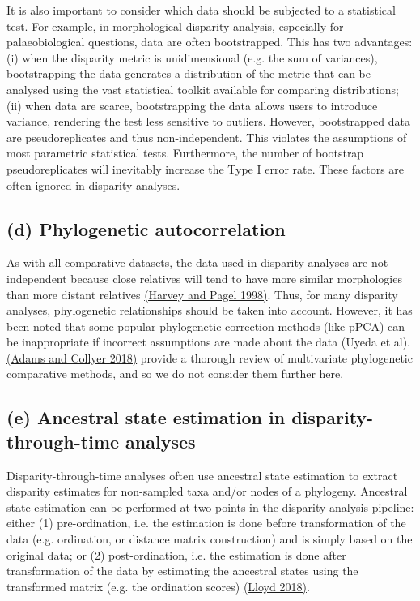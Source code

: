 It is also important to consider which data should be subjected to a
statistical test. For example, in morphological disparity analysis,
especially for palaeobiological questions, data are often bootstrapped.
This has two advantages: (i) when the disparity metric is unidimensional
(e.g. the sum of variances), bootstrapping the data generates a
distribution of the metric that can be analysed using the vast
statistical toolkit available for comparing distributions; (ii) when
data are scarce, bootstrapping the data allows users to introduce
variance, rendering the test less sensitive to outliers. However,
bootstrapped data are pseudoreplicates and thus non-independent. This
violates the assumptions of most parametric statistical tests.
Furthermore, the number of bootstrap pseudoreplicates will inevitably
increase the Type I error rate. These factors are often ignored in
disparity analyses.

\hypertarget{d-phylogenetic-autocorrelation}{%
\subsection{(d) Phylogenetic
autocorrelation}\label{d-phylogenetic-autocorrelation}}

As with all comparative datasets, the data used in disparity analyses
are not independent because close relatives will tend to have more
similar morphologies than more distant relatives
\href{https://paperpile.com/c/sTGYvp/WXik}{(Harvey and Pagel 1998)}.
Thus, for many disparity analyses, phylogenetic relationships should be
taken into account. However, it has been noted that some popular
phylogenetic correction methods (like pPCA) can be inappropriate if
incorrect assumptions are made about the data (Uyeda et al).
\href{https://paperpile.com/c/sTGYvp/ZnDd}{(Adams and Collyer 2018)}
provide a thorough review of multivariate phylogenetic comparative
methods, and so we do not consider them further here.

\hypertarget{e-ancestral-state-estimation-in-disparity-through-time-analyses}{%
\subsection{(e) Ancestral state estimation in disparity-through-time
analyses}\label{e-ancestral-state-estimation-in-disparity-through-time-analyses}}

Disparity-through-time analyses often use ancestral state estimation to
extract disparity estimates for non-sampled taxa and/or nodes of a
phylogeny. Ancestral state estimation can be performed at two points in
the disparity analysis pipeline: either (1) pre-ordination, i.e. the
estimation is done before transformation of the data (e.g. ordination,
or distance matrix construction) and is simply based on the original
data; or (2) post-ordination, i.e. the estimation is done after
transformation of the data by estimating the ancestral states using the
transformed matrix (e.g. the ordination scores)
\href{https://paperpile.com/c/sTGYvp/53SJ}{(Lloyd 2018)}.

